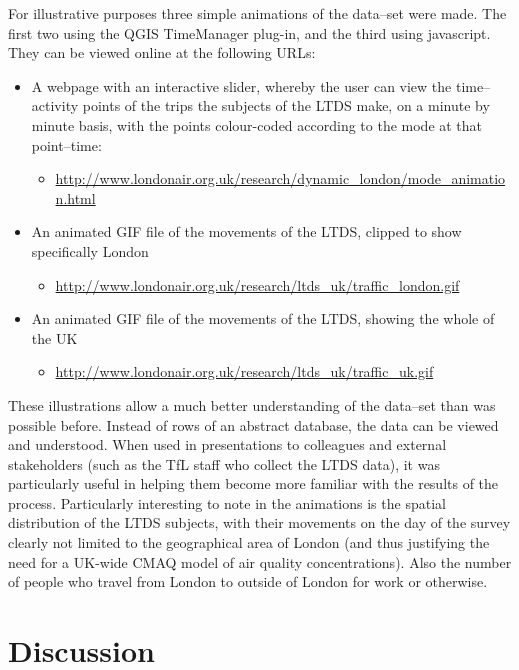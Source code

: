 For illustrative purposes three simple animations of the data--set were made. The first two using the QGIS TimeManager plug-in, and the third using javascript. They can be viewed online at the following URLs:

\begin{itemize}
\item A webpage with an interactive slider, whereby the user can view the time--activity points of the trips the subjects of the LTDS make, on a minute by minute basis, with the points colour-coded according to the mode at that point--time:
\begin{itemize}
\item \url{http://www.londonair.org.uk/research/dynamic_london/mode_animation.html}
\end{itemize}
\item An animated GIF file of the movements of the LTDS, clipped to show specifically London
\begin{itemize}
\item \url{http://www.londonair.org.uk/research/ltds_uk/traffic_london.gif}
\end{itemize}
\item An animated GIF file of the movements of the LTDS, showing the whole of the UK
\begin{itemize}
\item \url{http://www.londonair.org.uk/research/ltds_uk/traffic_uk.gif}
\end{itemize}
\end{itemize}

These illustrations allow a much better understanding of the data--set than was possible before. Instead of rows of an abstract database, the data can be viewed and understood. When used in presentations to colleagues and external stakeholders (such as the TfL staff who collect the LTDS data), it was particularly useful in helping them become more familiar with the results of the process. Particularly interesting to note in the animations is the spatial distribution of the LTDS subjects, with their movements on the day of the survey clearly not limited to the geographical area of London (and thus justifying the need for a UK-wide CMAQ model of air quality concentrations). Also the number of people who travel from London to outside of London for work or otherwise.

\section{Discussion}
\label{sec:1Discussion}


